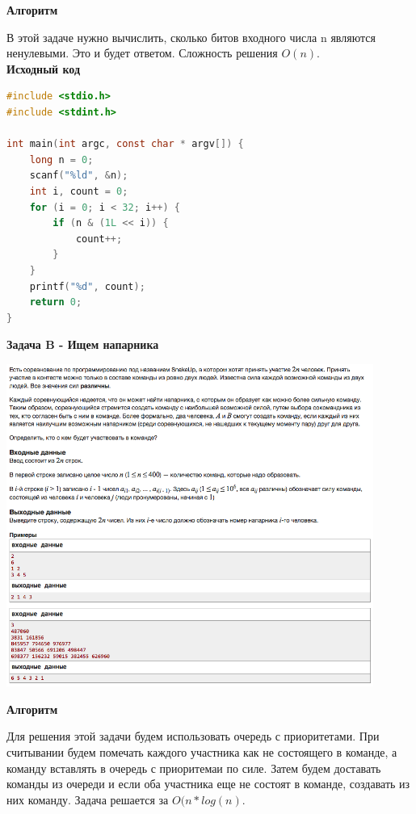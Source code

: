 \documentclass[a4paper,12pt]{article}
\begin{document}
\textbf{{\large Алгоритм}}

В этой задаче нужно вычислить, сколько битов входного числа n являются ненулевыми. Это и будет ответом. Сложность решения $O(n)$. \\

\textbf{{\large Исходный код}} \\
\begin{lstlisting}[language=C]
#include <stdio.h>
#include <stdint.h>

int main(int argc, const char * argv[]) {
    long n = 0;
    scanf("%ld", &n);
    int i, count = 0;
    for (i = 0; i < 32; i++) {
        if (n & (1L << i)) {
            count++;
        }
    }
    printf("%d", count);
    return 0;
}
\end{lstlisting}

\newpage
\textbf{{\large Задача B - Ищем напарника}}

\begin{center}
\includegraphics[width=0.9\textwidth]{C_320/B.png}\\ [1cm]
\end{center}

\textbf{{\large Алгоритм}}

Для решения этой задачи будем использовать очередь с приоритетами. При считывании будем помечать каждого участника как не состоящего в команде, а команду вставлять в очередь с приоритемаи по силе. Затем будем доставать команды из очереди и если оба участника еще не состоят в команде, создавать из них команду. Задача решается за $O(n * log(n)$.
\end{document}
